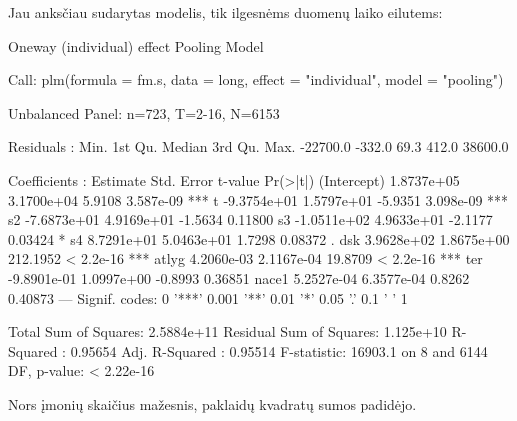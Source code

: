 \documentclass[a4paper]{article}
\begin{document}
Jau anksčiau sudarytas modelis, tik ilgesnėms duomenų laiko eilutems:
\begin{Schunk}
\begin{Soutput}
Oneway (individual) effect Pooling Model

Call:
plm(formula = fm.s, data = long, effect = "individual", model = "pooling")

Unbalanced Panel: n=723, T=2-16, N=6153

Residuals :
    Min.  1st Qu.   Median  3rd Qu.     Max. 
-22700.0   -332.0     69.3    412.0  38600.0 

Coefficients :
               Estimate  Std. Error  t-value  Pr(>|t|)    
(Intercept)  1.8737e+05  3.1700e+04   5.9108 3.587e-09 ***
t           -9.3754e+01  1.5797e+01  -5.9351 3.098e-09 ***
s2          -7.6873e+01  4.9169e+01  -1.5634   0.11800    
s3          -1.0511e+02  4.9633e+01  -2.1177   0.03424 *  
s4           8.7291e+01  5.0463e+01   1.7298   0.08372 .  
dsk          3.9628e+02  1.8675e+00 212.1952 < 2.2e-16 ***
atlyg        4.2060e-03  2.1167e-04  19.8709 < 2.2e-16 ***
ter         -9.8901e-01  1.0997e+00  -0.8993   0.36851    
nace1        5.2527e-04  6.3577e-04   0.8262   0.40873    
---
Signif. codes:  0 '***' 0.001 '**' 0.01 '*' 0.05 '.' 0.1 ' ' 1 

Total Sum of Squares:    2.5884e+11
Residual Sum of Squares: 1.125e+10
R-Squared      :  0.95654 
      Adj. R-Squared :  0.95514 
F-statistic: 16903.1 on 8 and 6144 DF, p-value: < 2.22e-16
\end{Soutput}
\end{Schunk}

Nors įmonių skaičius mažesnis, paklaidų
kvadratų sumos padidėjo.
\end{document}

